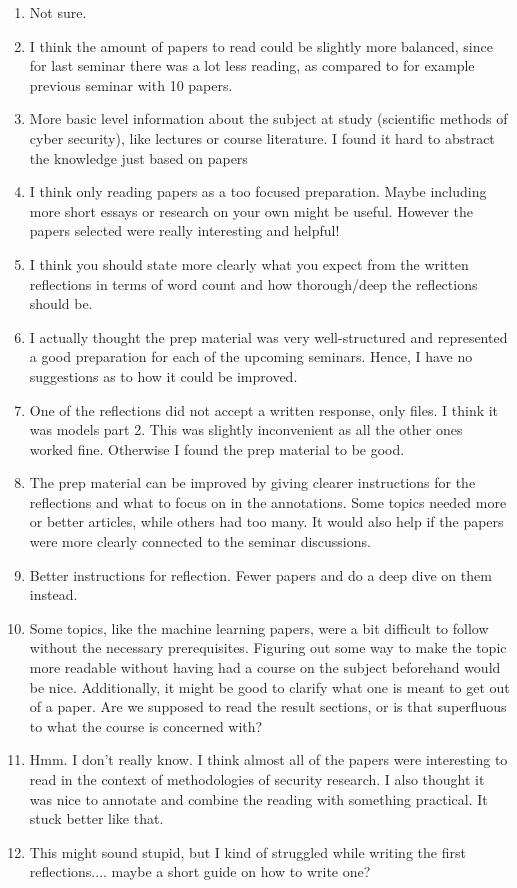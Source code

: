 \documentclass[a4paper]{report}
\begin{document}
\begin{enumerate}
  \item Not sure.
  \item I think the amount of papers to read could be slightly more balanced, since for last seminar there was a lot less reading, as compared to for example previous seminar with 10 papers.
  \item More basic level information about the subject at study (scientific methods of cyber security), like lectures or course literature. I found it hard to abstract the knowledge just based on papers
  \item I think only reading papers as a too focused preparation. Maybe including more short essays or research on your own might be useful. However the papers selected were really interesting and helpful!
  \item I think you should state more clearly what you expect from the written reflections in terms of word count and how thorough/deep the reflections should be.  
  \item I actually thought the prep material was very well-structured and represented a good preparation for each of the upcoming seminars. Hence, I have no suggestions as to how it could be improved.
  \item One of the reflections did not accept a written response, only files. I think it was models part 2. This was slightly inconvenient as all the other ones worked fine. Otherwise I found the prep material to be good.
  \item The prep material can be improved by giving clearer instructions for the reflections and what to focus on in the annotations. Some topics needed more or better articles, while others had too many. It would also help if the papers were more clearly connected to the seminar discussions.
  \item Better instructions for reflection.  Fewer papers and do a deep dive on them instead.
  \item Some topics, like the machine learning papers, were a bit difficult to follow without the necessary prerequisites. Figuring out some way to make the topic more readable without having had a course on the subject beforehand would be nice.  Additionally, it might be good to clarify what one is meant to get out of a paper. Are we supposed to read the result sections, or is that superfluous to what the course is concerned with?
  \item Hmm. I don't really know. I think almost all of the papers were interesting to read in the context of methodologies of security research. I also thought it was nice to annotate and combine the reading with something practical. It stuck better like that.
  \item This might sound stupid, but I kind of struggled while writing the first reflections.... maybe a short guide on how to write one?
\end{enumerate}
\end{document}
